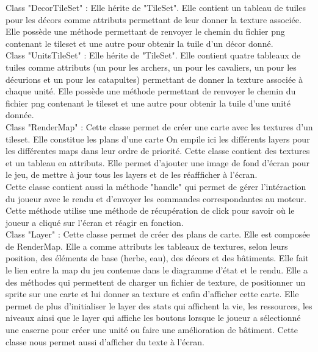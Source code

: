 \documentclass[12pt,a4paper]{article}
\begin{document}
Class "DecorTileSet" :  Elle hérite de "TileSet". Elle contient un tableau de tuiles pour les décors comme attributs permettant de leur donner la texture associée. Elle possède une méthode permettant de renvoyer le chemin du fichier png contenant le tileset et une autre pour obtenir la tuile d'un décor donné. \\

Class "UnitsTileSet" :  Elle hérite de "TileSet". Elle contient quatre tableaux de tuiles comme attributs (un pour les archers, un pour les cavaliers, un pour les décurions et un pour les catapultes) permettant de donner la texture associée à chaque unité. Elle possède une méthode permettant de renvoyer le chemin du fichier png contenant le tileset et une autre pour obtenir la tuile d'une unité donnée. \\

Class "RenderMap" : Cette classe permet de créer une carte avec les textures d'un tileset. Elle constitue les plans d'une carte On empile ici les différents layers pour les différentes maps dans leur ordre de priorité. Cette classe contient des textures et un tableau en attributs. Elle permet d'ajouter une image de fond d'écran pour le jeu, de mettre à jour tous les layers et de les réaffficher à l'écran.\\
Cette classe contient aussi la méthode "handle" qui permet de gérer l'intéraction du joueur avec le rendu et d'envoyer les commandes correspondantes au moteur. Cette méthode utilise une méthode de récupération de click pour savoir où le joueur a cliqué sur l'écran et réagir en fonction.\\

Class "Layer" : Cette classe permet de créer des plans de carte. Elle est composée de RenderMap. Elle a comme attributs les tableaux de textures, selon leurs position, des éléments de base (herbe, eau), des décors et des bâtiments. Elle fait le lien entre la map du jeu contenue dans le diagramme d'état et le rendu. Elle a des méthodes qui permettent de charger un fichier de texture, de positionner un sprite sur une carte et lui donner sa texture et enfin d'afficher cette carte. Elle permet de plus d'initialiser le layer des stats qui affichent la vie, les ressources, les niveaux ainsi que le layer qui affiche les boutons lorsque le joueur a sélectionné une caserne pour créer une unité ou faire une amélioration de bâtiment. Cette classe nous permet aussi d'afficher du texte à l'écran.
\end{document}
